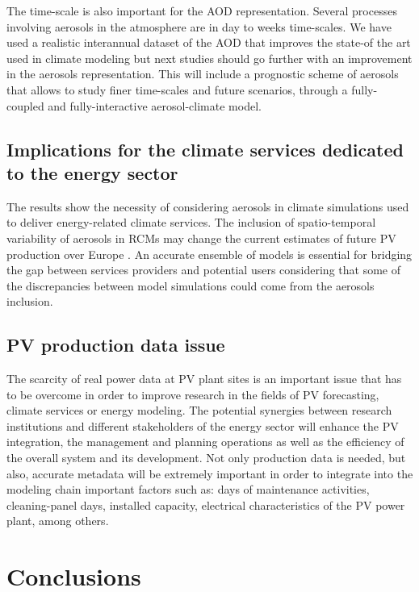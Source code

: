 The time-scale is also important for the AOD representation. Several processes involving aerosols in the atmosphere are in day to weeks time-scales. We have used a realistic interannual dataset of the AOD that improves the state-of the art used in climate modeling but next studies should go further with an improvement in the aerosols representation. This will include a prognostic scheme of aerosols that allows to study finer time-scales and future scenarios, through a fully-coupled and fully-interactive aerosol-climate model. 
  

\subsection{Implications for the climate services dedicated to the energy sector }

The results show the necessity of considering aerosols in climate simulations used to deliver energy-related climate services. The inclusion of spatio-temporal variability of aerosols in RCMs may change the current estimates of future PV production over Europe \cite*{Jerez2015}. An accurate ensemble of models is essential for bridging the gap between services providers and potential users considering that some of the discrepancies between model simulations could come from the aerosols inclusion.

\subsection{PV production data issue}

The scarcity of real power data at PV plant sites is an important issue that has to be overcome in order to improve research in the fields of PV forecasting, climate services or energy modeling. The potential synergies between research institutions and different stakeholders of the energy sector will enhance the PV integration, the management and planning operations as well as the efficiency of the overall system and its development. Not only production data is needed, but also, accurate metadata will be extremely important in order to integrate into the modeling chain important factors such as: days of maintenance activities, cleaning-panel days, installed capacity, electrical characteristics of the PV power plant, among others.

\section{Conclusions}


